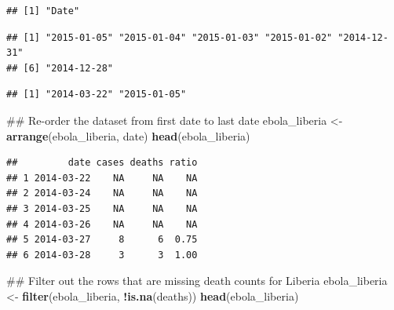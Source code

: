 \documentclass[]{book}
\makeatletter
\newenvironment{Shaded}{\begin{snugshade}}{\end{snugshade}}
\newcommand{\KeywordTok}[1]{\textcolor[rgb]{0.13,0.29,0.53}{\textbf{#1}}}
\newcommand{\StringTok}[1]{\textcolor[rgb]{0.31,0.60,0.02}{#1}}
\newcommand{\OperatorTok}[1]{\textcolor[rgb]{0.81,0.36,0.00}{\textbf{#1}}}
\newcommand{\NormalTok}[1]{#1}
\newenvironment{kframe}{%
\medskip{}
\setlength{\fboxsep}{.8em}
 \def\at@end@of@kframe{}%
 \ifinner\ifhmode%
  \def\at@end@of@kframe{\end{minipage}}%
  \begin{minipage}{\columnwidth}%
 \fi\fi%
 \def\FrameCommand##1{\hskip\@totalleftmargin \hskip-\fboxsep
 \colorbox{shadecolor}{##1}\hskip-\fboxsep
     \hskip-\linewidth \hskip-\@totalleftmargin \hskip\columnwidth}%
 \MakeFramed {\advance\hsize-\width
   \@totalleftmargin\z@ \linewidth\hsize
   \@setminipage}}%
 {\par\unskip\endMakeFramed%
 \at@end@of@kframe}
\renewenvironment{Shaded}{\begin{kframe}}{\end{kframe}}
\theoremstyle{definition}
\theoremstyle{definition}
\theoremstyle{definition}
\theoremstyle{remark}
\makeatother
\begin{document}
\begin{verbatim}
## [1] "Date"
\end{verbatim}

\begin{Shaded}
\end{Shaded}

\begin{verbatim}
## [1] "2015-01-05" "2015-01-04" "2015-01-03" "2015-01-02" "2014-12-31"
## [6] "2014-12-28"
\end{verbatim}

\begin{Shaded}
\end{Shaded}

\begin{verbatim}
## [1] "2014-03-22" "2015-01-05"
\end{verbatim}

\begin{Shaded}
\begin{Highlighting}[]
\NormalTok{## Re-order the dataset from first date to last date}
\NormalTok{ebola_liberia <-}\StringTok{ }\KeywordTok{arrange}\NormalTok{(ebola_liberia, date)}
\KeywordTok{head}\NormalTok{(ebola_liberia)}
\end{Highlighting}
\end{Shaded}

\begin{verbatim}
##         date cases deaths ratio
## 1 2014-03-22    NA     NA    NA
## 2 2014-03-24    NA     NA    NA
## 3 2014-03-25    NA     NA    NA
## 4 2014-03-26    NA     NA    NA
## 5 2014-03-27     8      6  0.75
## 6 2014-03-28     3      3  1.00
\end{verbatim}

\begin{Shaded}
\begin{Highlighting}[]
\NormalTok{## Filter out the rows that are missing death counts for Liberia}
\NormalTok{ebola_liberia <-}\StringTok{ }\KeywordTok{filter}\NormalTok{(ebola_liberia, }\OperatorTok{!}\KeywordTok{is.na}\NormalTok{(deaths))}
\KeywordTok{head}\NormalTok{(ebola_liberia)}
\end{Highlighting}
\end{Shaded}
\end{document}
